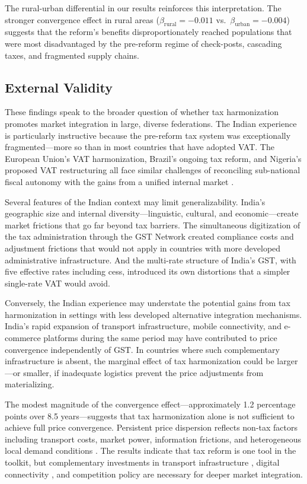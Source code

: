 \documentclass[12pt]{article}
\begin{document}
The rural-urban differential in our results reinforces this interpretation. The stronger convergence effect in rural areas ($\beta_{\text{rural}} = -0.011$ vs.\ $\beta_{\text{urban}} = -0.004$) suggests that the reform's benefits disproportionately reached populations that were most disadvantaged by the pre-reform regime of check-posts, cascading taxes, and fragmented supply chains.

\subsection{External Validity}

These findings speak to the broader question of whether tax harmonization promotes market integration in large, diverse federations. The Indian experience is particularly instructive because the pre-reform tax system was exceptionally fragmented---more so than in most countries that have adopted VAT. The European Union's VAT harmonization, Brazil's ongoing tax reform, and Nigeria's proposed VAT restructuring all face similar challenges of reconciling sub-national fiscal autonomy with the gains from a unified internal market \citep{cnossen2015mobilizing, keen2013value}.

Several features of the Indian context may limit generalizability. India's geographic size and internal diversity---linguistic, cultural, and economic---create market frictions that go far beyond tax barriers. The simultaneous digitization of the tax administration through the GST Network created compliance costs and adjustment frictions that would not apply in countries with more developed administrative infrastructure. And the multi-rate structure of India's GST, with five effective rates including cess, introduced its own distortions that a simpler single-rate VAT would avoid.

Conversely, the Indian experience may understate the potential gains from tax harmonization in settings with less developed alternative integration mechanisms. India's rapid expansion of transport infrastructure, mobile connectivity, and e-commerce platforms during the same period may have contributed to price convergence independently of GST. In countries where such complementary infrastructure is absent, the marginal effect of tax harmonization could be larger---or smaller, if inadequate logistics prevent the price adjustments from materializing.

The modest magnitude of the convergence effect---approximately 1.2 percentage points over 8.5 years---suggests that tax harmonization alone is not sufficient to achieve full price convergence. Persistent price dispersion reflects non-tax factors including transport costs, market power, information frictions, and heterogeneous local demand conditions \citep{atkin2018retail}. The results indicate that tax reform is one tool in the toolkit, but complementary investments in transport infrastructure \citep{donaldson2018railroads, asher2020rural}, digital connectivity \citep{jensen2007digital}, and competition policy are necessary for deeper market integration.
\end{document}
